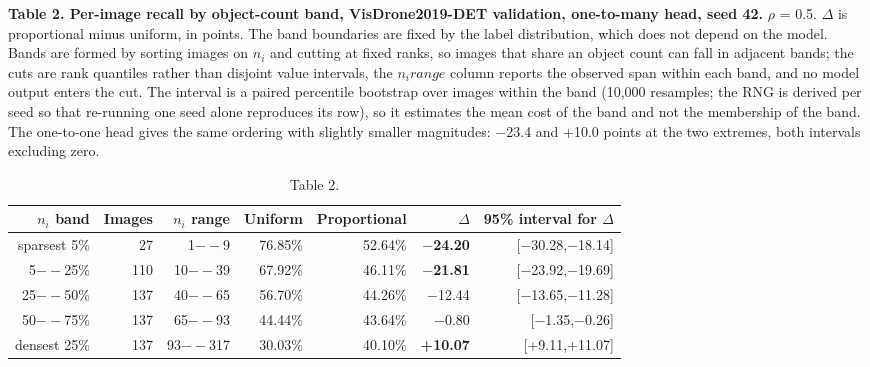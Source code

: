 \documentclass[sn-mathphys,Numbered]{sn-jnl}
\begin{document}
\textbf{Table 2. Per-image recall by object-count band, VisDrone2019-DET validation, one-to-many head, seed 42.} $\rho$ = 0.5. $\Delta$ is proportional minus uniform, in points. The band boundaries are fixed by the label distribution, which does not depend on the model. Bands are formed by sorting images on $n_i$ and cutting at fixed ranks, so images that share an object count can fall in adjacent bands; the cuts are rank quantiles rather than disjoint value intervals, the $n_i range$ column reports the observed span within each band, and no model output enters the cut. The interval is a paired percentile bootstrap over images within the band (10,000 resamples; the RNG is derived per seed so that re-running one seed alone reproduces its row), so it estimates the mean cost of the band and not the membership of the band. The one-to-one head gives the same ordering with slightly smaller magnitudes: $-$23.4 and +10.0 points at the two extremes, both intervals excluding zero.

\begin{table}[t]
\centering
\small
\sloppy
\setlength{\tabcolsep}{3pt}
\caption{Table 2.}
\label{tab2}
\begin{tabularx}{\textwidth}{@{}RRRRRRR@{}}
\toprule
$n_i$ band & Images & $n_i$ range & Uniform & Proportional & $\Delta$ & 95\% interval for $\Delta$ \\
\midrule
sparsest 5\% & 27 & 1$--$9 & 76.85\% & 52.64\% & \textbf{$-$24.20} & [$-$30.28,\allowbreak $-$18.14] \\
5$--$25\% & 110 & 10$--$39 & 67.92\% & 46.11\% & \textbf{$-$21.81} & [$-$23.92,\allowbreak $-$19.69] \\
25$--$50\% & 137 & 40$--$65 & 56.70\% & 44.26\% & $-$12.44 & [$-$13.65,\allowbreak $-$11.28] \\
50$--$75\% & 137 & 65$--$93 & 44.44\% & 43.64\% & $-$0.80 & [$-$1.35,\allowbreak $-$0.26] \\
densest 25\% & 137 & 93$--$317 & 30.03\% & 40.10\% & \textbf{+10.07} & [+9.11,\allowbreak +11.07] \\
\bottomrule
\end{tabularx}
\end{table}
\end{document}
